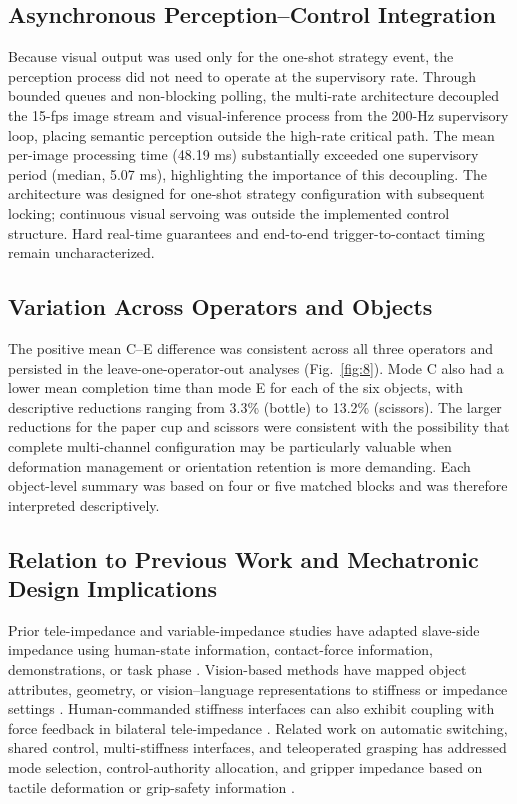 \subsection{Asynchronous Perception--Control Integration}
Because visual output was used only for the one-shot strategy event, the perception process did not need to operate at the supervisory rate. Through bounded queues and non-blocking polling, the multi-rate architecture decoupled the 15-fps image stream and visual-inference process from the 200-Hz supervisory loop, placing semantic perception outside the high-rate critical path. The mean per-image processing time (48.19 ms) substantially exceeded one supervisory period (median, 5.07 ms), highlighting the importance of this decoupling. The architecture was designed for one-shot strategy configuration with subsequent locking; continuous visual servoing was outside the implemented control structure. Hard real-time guarantees and end-to-end trigger-to-contact timing remain uncharacterized.

\subsection{Variation Across Operators and Objects}
The positive mean C--E difference was consistent across all three operators and persisted in the leave-one-operator-out analyses (Fig.~\ref{fig:8}). Mode C also had a lower mean completion time than mode E for each of the six objects, with descriptive reductions ranging from 3.3\% (bottle) to 13.2\% (scissors). The larger reductions for the paper cup and scissors were consistent with the possibility that complete multi-channel configuration may be particularly valuable when deformation management or orientation retention is more demanding. Each object-level summary was based on four or five matched blocks and was therefore interpreted descriptively.

\subsection{Relation to Previous Work and Mechatronic Design Implications}
Prior tele-impedance and variable-impedance studies have adapted slave-side impedance using human-state information, contact-force information, demonstrations, or task phase \cite{ref06,ref07,ref08,ref09,ref18,ref19,ref20,ref21}. Vision-based methods have mapped object attributes, geometry, or vision--language representations to stiffness or impedance settings \cite{ref10,ref11,ref13,ref14}. Human-commanded stiffness interfaces can also exhibit coupling with force feedback in bilateral tele-impedance \cite{ref29}. Related work on automatic switching, shared control, multi-stiffness interfaces, and teleoperated grasping has addressed mode selection, control-authority allocation, and gripper impedance based on tactile deformation or grip-safety information \cite{ref12,ref15,ref16,ref23,ref24}.

